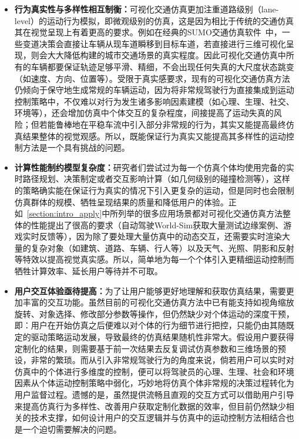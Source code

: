 \begin{itemize}
    \item \textbf{行为真实性与多样性相互制衡：}可视化交通仿真更加注重道路级别（lane-level）的运动行为模拟，即微观级别的仿真，这是因为相比于传统的交通仿真其在视觉呈现上有着更高的要求。例如在经典的SUMO交通仿真软件~\cite{krajzewicz2002sumo}中，一些变道决策会直接让车辆从现车道瞬移到目标车道，若直接进行三维可视化呈现，则会大大降低构建的城市交通场景的真实程度。因此可视化交通仿真中所有的车辆都要保证轨迹足够平滑、精细，不会出现任何失真的大尺度状态跳变（如速度、方向、位置等）。受限于真实感要求，现有的可视化交通仿真方法仍倾向于保守地生成常规的车辆运动，因为将非常规驾驶行为直接集成到运动控制策略中，不仅难以对行为发生诸多影响因素建模（如心理、生理、社交、环境等），还会增加仿真中个体交互的复杂程度，间接提高了运动失真的风险；但若能鲁棒地在平稳车流中引入部分非常规的行为，其实又能提高最终仿真结果整体的视觉观感。所以，既能保证行为真实又能提高其多样性的运动控制方法是一个具有挑战的问题。


    \item \textbf{计算性能制约模型复杂度：}研究者们尝试过为每一个仿真个体均使用完备的实时路径规划、决策制定或者交互影响计算（如几何级别的碰撞检测等），这样的策略确实能在保证行为真实的情况下引入更复杂的运动，但是同时也会限制仿真群体的规模、牺牲呈现结果的质量和降低用户的体验。正如~\ref{section:intro_apply}中所列举的很多应用场景都对可视化交通仿真方法整体的性能提出了很高的要求（自动驾驶World-Sim获取大量测试边缘案例、游戏实时反馈等），因为除了要处理大量仿真中的动态交互，还需要实时渲染大量的复杂对象（如建筑、道路、车辆、行人等）以及天气、光照、阴影和反射等特效以提高视觉真实感。所以，简单地为每一个个体引入更精细运动控制而牺牲计算效率、延长用户等待并不可取。


    \item \textbf{用户交互体验亟待提高：}为了让用户能够更好地理解和获取仿真结果，需要更加丰富的交互功能。虽然目前的可视化交通仿真方法中已有能支持如视角缩放旋转、对象选择、修改部分参数等操作，但仍然缺少对个体运动的深度干预，即：用户在开始仿真之后便难以对个体的行为细节进行把控，只能仍由其随既定的驱动策略运动发展，导致最终的仿真结果随机性非常大。假设用户要获得定制化的结果，则需要基于前一次结果去反复调试仿真参数和三维场景的预设，非常的繁琐。而从引入非常规驾驶行为的角度来说，倘若用户可以实时对仿真中的个体进行多维度的控制，便可以将驾驶员的心理、生理、社会和环境因素从个体运动控制策略中弱化，巧妙地将仿真个体非常规的决策过程转化为用户监督过程。遗憾的是，虽然提供流畅且直观的交互方式可以借助用户引导来提高仿真行为多样性、改善用户获取定制化数据的效率，但目前仍然缺少相关的技术支撑，如何设计用户的交互逻辑并与仿真中的运动控制方法相结合也是一个迫切需要解决的问题。

\end{itemize}



